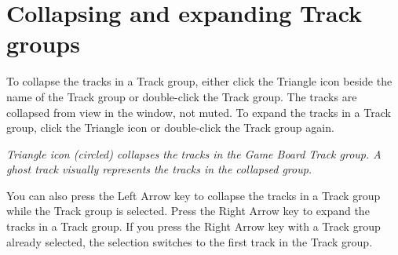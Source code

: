 \chapter{Collapsing and expanding Track groups}
\hypertarget{md__hey_tea_9_2_library_2_package_cache_2com_8unity_8timeline_0d1_87_85_2_documentation_0i_2grp__hide}{}\label{md__hey_tea_9_2_library_2_package_cache_2com_8unity_8timeline_0d1_87_85_2_documentation_0i_2grp__hide}
\label{md__hey_tea_9_2_library_2_package_cache_2com_8unity_8timeline_0d1_87_85_2_documentation_0i_2grp__hide_autotoc_md4642}%
%
 To collapse the tracks in a Track group, either click the Triangle icon beside the name of the Track group or double-\/click the Track group. The tracks are collapsed from view in the  window, not muted. To expand the tracks in a Track group, click the Triangle icon or double-\/click the Track group again.



{\itshape Triangle icon (circled) collapses the tracks in the Game Board Track group. A ghost track visually represents the tracks in the collapsed group.}

You can also press the Left Arrow key to collapse the tracks in a Track group while the Track group is selected. Press the Right Arrow key to expand the tracks in a Track group. If you press the Right Arrow key with a Track group already selected, the selection switches to the first track in the Track group. 